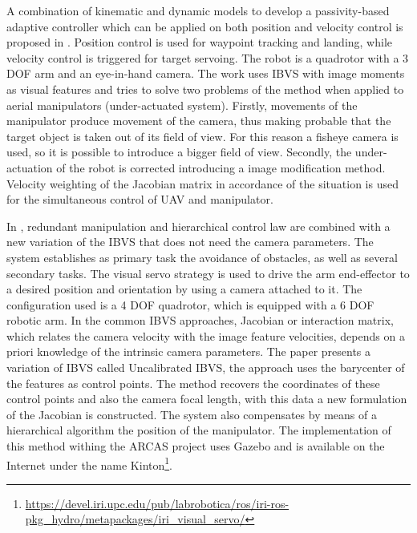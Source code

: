 
A combination of kinematic and dynamic models to develop a passivity-based adaptive controller which can be applied on both position and velocity control is proposed in \cite{kim_vision-guided_2016}. Position control is used for waypoint tracking and landing, while velocity control is triggered for target servoing. The robot is a quadrotor with a 3 DOF arm and an eye-in-hand camera. The work uses IBVS with image moments as visual features and tries to solve two problems of the method when applied to aerial manipulators (under-actuated system). Firstly, movements of the manipulator produce movement of the camera, thus making probable that the target object is taken out of its field of view. For this reason a fisheye camera is used, so it is possible to introduce a bigger field of view. Secondly, the under-actuation of the robot is corrected introducing a image modification method. Velocity weighting of the Jacobian matrix in accordance of the situation is used for the simultaneous control of UAV and manipulator.


In \cite{santamaria-navarro_uncalibrated_2017}, redundant manipulation and hierarchical control law are combined with a new variation of the IBVS that does not need the camera parameters. The system establishes as primary task the avoidance of obstacles, as well as several secondary tasks. The visual servo strategy is used to drive the arm end-effector to a desired position and orientation by using a camera attached to it. The configuration used is a 4 DOF quadrotor, which is equipped with a 6 DOF robotic arm. In the common IBVS approaches, Jacobian or interaction matrix, which relates the camera velocity with the image feature velocities, depends on a priori knowledge of the intrinsic camera parameters. The paper presents a variation of IBVS called Uncalibrated IBVS, the approach uses the barycenter of the features as control points. The method recovers the coordinates of these control points and also the camera focal length, with this data a new formulation of the Jacobian is constructed. The system also compensates by means of a hierarchical algorithm the position of the manipulator. The implementation of this method withing the ARCAS project uses Gazebo and is available on the Internet under the name Kinton\footnote{\url{https://devel.iri.upc.edu/pub/labrobotica/ros/iri-ros-pkg_hydro/metapackages/iri_visual_servo/}}.

